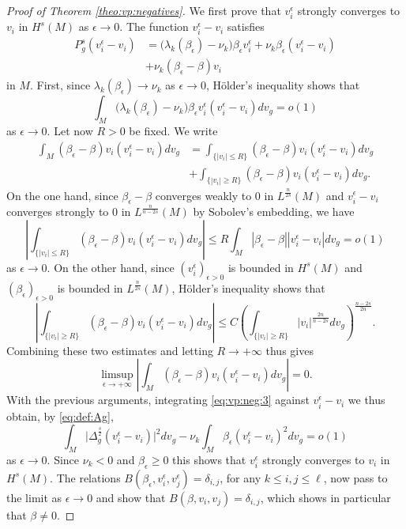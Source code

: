 \documentclass[10pt]{amsart}
\numberwithin{equation}{section}
\def\ep{{\varepsilon}}
\def \ep{\epsilon}
\theoremstyle{plain}
\theoremstyle{remark}
\begin{document}
\begin{proof}[Proof of Theorem \ref{theo:vp:negatives}]
 We first prove that $v_i^{\epsilon}$ strongly converges to $v_i$ in $H^s(M)$ as $\epsilon \to 0$. The function $v_i^{\epsilon} - v_i$ satisfies
  \begin{equation} \label{eq:vp:neg:3} \begin{aligned}
 P_g^s(v_i^{\epsilon} - v_i) & = \big(\lambda_k(\beta_\epsilon) -\nu_k \big) \beta_\epsilon v_i^{\epsilon} + \nu_k \beta_\epsilon (v_i^{\epsilon} - v_i) \\
 & + \nu_k  (\beta_\epsilon - \beta) v_i
 \end{aligned} 
 \end{equation}
 in $M$. First, since $\lambda_k(\beta_\epsilon) \to \nu_k$ as $\epsilon \to 0$, H\"older's inequality shows that 
 $$ \int_M \big(\lambda_k(\beta_\epsilon) -\nu_k \big) \beta_\epsilon v_i^{\epsilon}(v_i^{\epsilon} - v_i) dv_g = o(1) $$
 as $\ep \to 0$. Let now $R>0$ be fixed. We write 
 $$\begin{aligned} 
  \int_M  (\beta_\epsilon - \beta) v_i (v_i^{\epsilon} - v_i) dv_g & = \int_{\{ |v_i| \le R \}}  (\beta_\epsilon - \beta) v_i (v_i^{\epsilon} - v_i) dv_g \\
  & +  \int_{\{ |v_i| \ge R \}}  (\beta_\epsilon - \beta) v_i (v_i^{\epsilon} - v_i) dv_g.
  \end{aligned} $$ 
  On the one hand, since $\beta_{\epsilon} - \beta$ converges weakly to $0$ in $L^{\frac{n}{2s}}(M)$ and $v_i^{\epsilon} - v_i$ converges strongly to $0$ in $L^{\frac{n}{n-2s}}(M)$ by Sobolev's embedding, we have 
$$ \left| \int_{\{ |v_i| \le R \}}   (\beta_\epsilon - \beta) v_i (v_i^{\epsilon} - v_i) dv_g \right| \le R \int_M |\beta_\epsilon - \beta| |v_i^{\epsilon} - v_i| dv_g = o(1) $$
as $\epsilon \to 0$. On the other hand, since $(v_i^{\ep})_{\ep >0}$ is bounded in $H^s(M)$ and $(\beta_\ep)_{\ep >0}$ is bounded in $L^{\frac{n}{2s}}(M)$, H\"older's inequality shows that 
$$ \left|  \int_{\{ |v_i| \ge R \}}  (\beta_\epsilon - \beta) v_i (v_i^{\epsilon} - v_i) dv_g \right| \le C \left( \int_{\{ |v_i| \ge R \}} |v_i|^{\frac{2n}{n-2s}} dv_g\right)^{\frac{n-2s}{2n}} .$$
Combining these two estimates and letting $R \to + \infty$ thus gives 
$$ \limsup_{\ep \to + \infty} \left|   \int_M  (\beta_\epsilon - \beta) v_i (v_i^{\epsilon} - v_i) dv_g \right|  =0. $$
With the previous arguments, integrating \eqref{eq:vp:neg:3} against $v_i^{\epsilon} - v_i$ we thus obtain, by \eqref{eq:def:Ag}, 
$$ \int_M  \big|\Delta_g^{\frac{s}{2}} (v_i^{\epsilon} - v_i) \big|^2 dv_g - \nu_k \int_M \beta_\epsilon (v_i^{\epsilon} - v_i)^2dv_g = o(1) $$
as $\epsilon \to 0$. Since $\nu_k < 0$ and $\beta_\epsilon \ge 0$ this shows that  $v_i^{\epsilon}$ strongly converges to $v_i$ in $H^s(M)$. The relations $B(\beta_\epsilon, v_i^{\epsilon}, v_j^{\epsilon}) = \delta_{i,j}$, for any $k \le i,j \le \ell$, now pass to the limit as $\epsilon \to 0$ and show that $B(\beta, v_i, v_j) = \delta_{i,j}$, which shows in particular that $\beta \neq 0$. 


\end{proof}
\end{document}
